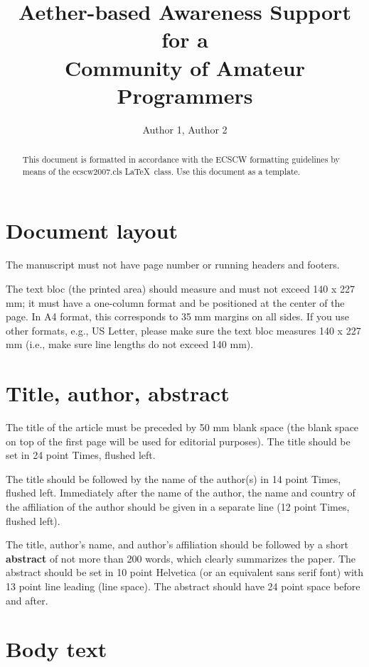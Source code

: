 \documentclass{ecscw2007}
\title{Aether-based Awareness Support for a\\Community of Amateur Programmers}
\author{Author 1, Author 2}
\affiliation{Institute 1, Country, Institute 2, Country}
\begin{document}
\maketitle
\thispagestyle{empty}


\begin{abstract}
  This document is formatted in accordance with the ECSCW formatting
  guidelines by means of the ecscw2007.cls \LaTeX\ class.
  Use this document as a template.
\end{abstract}

\section*{Document layout} 

The manuscript must not have page number or running headers and footers. 

The text bloc (the printed area) should measure and must not exceed
140 x 227 mm; it must have a one-column format and be positioned at
the center of the page.  In A4 format, this corresponds to 35 mm
margins on all sides. If you use other formats, e.g., US Letter,
please make sure the text bloc measures 140 x 227 mm (i.e., make sure
line lengths do not exceed 140 mm).

\section*{Title, author, abstract} 

The title of the article must be preceded by 50 mm blank space (the blank space on 
top of the first page will be used for editorial purposes). The title should be set in 24 
point Times, flushed left. 

The title should be followed by the name of the author(s) in 14 point Times, 
flushed left. Immediately after the name of the author, the name and country of the 
affiliation of the author should be given in a separate line (12 point Times, flushed 
left). 

The title, author's name, and author's affiliation should be followed by a short 
{\bf abstract} of not more than 200 words, which clearly summarizes the paper. The
abstract should be set in 10 point Helvetica (or an equivalent sans serif font) with 13 
point line leading (line space). The abstract should have 24 point space before and 
after. 

\section*{Body text}
 
\end{document}
